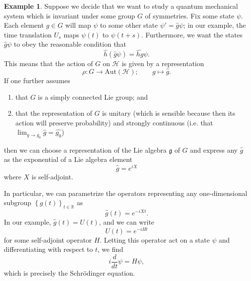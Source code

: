 \documentclass[a4paper,10pt]{scrreprt}
\newcommand{\tder}[2]{\frac{d #1}{d #2}}
\newcommand{\R}{\mathbb{R}}
\theoremstyle{definition}
\newtheorem{example}{Example}[section]
\theoremstyle{plain}
\theoremstyle{remark}
\begin{document}
\begin{example}
  Suppose we decide that we want to study a quantum mechanical system which is invariant under some group $G$ of symmetries. Fix some state $\psi$. Each element $g \in G$ will map $\psi$ to some other state $\psi' = \hat{g}\psi$; in our example, the time translation $U_{s}$ maps $\psi(t)$ to $\psi(t + s)$. Furthermore, we want the states $\hat{g}\psi$ to obey the reasonable condition that 
  \begin{equation*}
    \hat{h}(\hat{g}\psi) = \widehat{hg}\psi.
  \end{equation*}
  This means that the action of $G$ on $\mathscr{H}$ is given by a representation 
  \begin{equation*}
    \rho\colon G \to \mathrm{Aut}(\mathscr{H});\qquad g \mapsto \hat{g}.
  \end{equation*}
  If one further assumes
  \begin{enumerate}
    \item that $G$ is a simply connected Lie group; and

    \item that the representation of $G$ is unitary (which is sensible because then its action will preserve probability) and strongly continuous (i.e. that $\lim_{g \to g_{0}}\hat{g} = \hat{g_{0}}$)
  \end{enumerate}
  then we can choose a representation of the Lie algebra $\mathfrak{g}$ of $G$ and express any $\hat{g}$ as the exponential of a Lie algebra element
  \begin{equation*}
    \hat{g} = e^{i X}
  \end{equation*}
  where $X$ is self-adjoint. 

  In particular, we can parametrize the operators representing any one-dimensional subgroup $\left\{ g(t) \right\}_{t \in \R}$ as
  \begin{equation*}
    \hat{g}(t) = e^{-iXt}.
  \end{equation*}
  In our example, $\hat{g}(t) = U(t)$, and we can write
  \begin{equation*}
    U(t) = e^{-i H t}
  \end{equation*}
  for some self-adjoint operator $H$. Letting this operator act on a state $\psi$ and differentiating with respect to $t$, we find
  \begin{equation*}
    i \tder{}{t} \psi = H \psi,
  \end{equation*}
  which is precisely the Schr\"{o}dinger equation.
\end{example}
\end{document}
